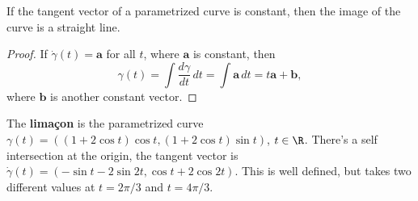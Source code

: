 \begin{prop}
    If the tangent vector of a parametrized curve is constant, then the image of the curve is a straight line.
\end{prop}
\begin{proof}
    If $\dot \gamma(t)=\mathbf a$ for all $t$, where $\mathbf a$ is constant, then \[
        \gamma(t)= \int \frac{d\gamma}{dt} \, dt=\int \mathbf a \, dt=t\mathbf a+\mathbf b,
    \] where $\mathbf b$ is another constant vector.
\end{proof}
\begin{example}
    The \textbf{lima\c con} is the parametrized curve $\gamma(t)=((1+2 \cos t) \cos t,(1+2 \cos t) \sin t)$, $t\in \R$. There's a self intersection at the origin, the tangent vector is $\dot\gamma(t)=(-\sin t - 2 \sin 2t, \cos t + 2 \cos 2t)$. This is well defined, but takes two different values at $t = 2\pi /3$ and $t= 4\pi /3$.
\end{example}

